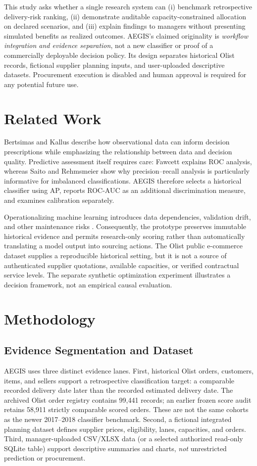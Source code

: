 \documentclass[conference,a4paper]{IEEEtran}
\begin{document}
This study asks whether a single research system can (i) benchmark retrospective delivery-risk ranking, (ii) demonstrate auditable capacity-constrained allocation on declared scenarios, and (iii) explain findings to managers without presenting simulated benefits as realized outcomes. AEGIS's claimed originality is \emph{workflow integration and evidence separation}, not a new classifier or proof of a commercially deployable decision policy. Its design separates historical Olist records, fictional supplier planning inputs, and user-uploaded descriptive datasets. Procurement execution is disabled and human approval is required for any potential future use.

\section{Related Work}
Bertsimas and Kallus \cite{bertsimas2020} describe how observational data can inform decision prescriptions while emphasizing the relationship between data and decision quality. Predictive assessment itself requires care: Fawcett \cite{fawcett2006} explains ROC analysis, whereas Saito and Rehmsmeier \cite{saito2015} show why precision--recall analysis is particularly informative for imbalanced classifications. AEGIS therefore selects a historical classifier using AP, reports ROC-AUC as an additional discrimination measure, and examines calibration separately.

Operationalizing machine learning introduces data dependencies, validation drift, and other maintenance risks \cite{sculley2015}. Consequently, the prototype preserves immutable historical evidence and permits research-only scoring rather than automatically translating a model output into sourcing actions. The Olist public e-commerce dataset \cite{olist2018} supplies a reproducible historical setting, but it is not a source of authenticated supplier quotations, available capacities, or verified contractual service levels. The separate synthetic optimization experiment illustrates a decision framework, not an empirical causal evaluation.

\section{Methodology}
\subsection{Evidence Segmentation and Dataset}
AEGIS uses three distinct evidence lanes. First, historical Olist orders, customers, items, and sellers support a retrospective classification target: a comparable recorded delivery date later than the recorded estimated delivery date. The archived Olist order registry contains 99,441 records; an earlier frozen score audit retains 58,911 strictly comparable scored orders. These are not the same cohorts as the newer 2017--2018 classifier benchmark. Second, a fictional integrated planning dataset defines supplier prices, eligibility, lanes, capacities, and orders. Third, manager-uploaded CSV/XLSX data (or a selected authorized read-only SQLite table) support descriptive summaries and charts, \emph{not} unrestricted prediction or procurement.
\end{document}
